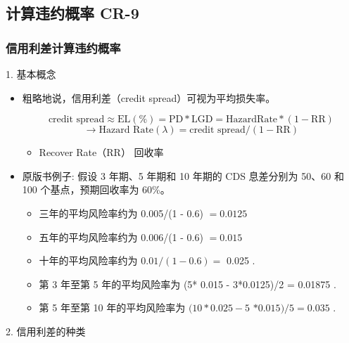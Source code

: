 \subsection{计算违约概率 CR-9}

\subsubsection{信用利差计算违约概率}



1. 基本概念

\begin{itemize}
\item 粗略地说，信用利差（credit spread）可视为平均损失率。

\[ \text{credit spread} \approx  \mathrm{{EL}}\left( \% \right)  = \mathrm{{PD}} * \mathrm{{LGD}} = \mathrm{{HazardRate}} * \left( {1 - \mathrm{{RR}}}\right)\]
\[\rightarrow   \text{Hazard Rate} \left( \lambda \right)  = \text{credit spread} /\left( {1 - \mathrm{{RR}}}\right)\]

\begin{itemize}
    \item Recover Rate（RR）  回收率
\end{itemize}

 \item 原版书例子: 假设 3 年期、5 年期和 10 年期的 CDS 息差分别为 50、60 和 100 个基点，预期回收率为 60\%。
 \begin{itemize}

    \item 三年的平均风险率约为 0.005/(1 - 0.6) \(= {0.0125}\) 

    \item 五年的平均风险率约为 0.006/(1 - 0.6) \(= {0.015}\) 

    \item 十年的平均风险率约为 \({0.01}/\left( {1 - {0.6}}\right)  =\) 0.025 .

    \item 第 3 年至第 5 年的平均风险率为 (5* 0.015 - 3*0.0125)/2 = 0.01875 .

    \item 第 5 年至第 10 年的平均风险率为 \(({10} * {0.025} - 5\)  \(* {0.015})/5 = {0.035}\) .

\end{itemize}

\end{itemize}


2. 信用利差的种类

